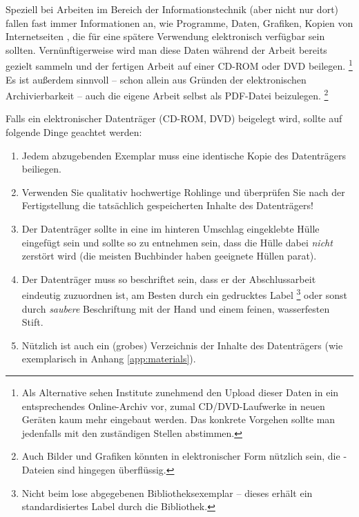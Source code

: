 Speziell bei Arbeiten im Bereich der Informationstechnik (aber
nicht nur dort) fallen fast immer Informationen an, wie Programme,
Daten, Grafiken, Kopien von Internetseiten \usw, die für eine
spätere Verwendung elektronisch verfügbar sein sollten.
Vernünftigerweise wird man diese Daten während der Arbeit bereits
gezielt sammeln und der fertigen Arbeit auf einer CD-ROM oder DVD  beilegen.%
\footnote{Als Alternative sehen Institute zunehmend den Upload dieser Daten
in ein entsprechendes Online-Archiv vor, zumal CD/DVD-Laufwerke in
neuen Geräten kaum mehr eingebaut werden. Das konkrete Vorgehen sollte man 
jedenfalls mit den zuständigen Stellen abstimmen.}
Es ist außerdem sinnvoll -- schon allein
aus Gründen der elektronischen Archivierbarkeit -- auch die eigene Arbeit
selbst als PDF-Datei beizulegen.%
\footnote{Auch Bilder und Grafiken könnten in elektronischer Form nützlich
sein, die \latex-Dateien sind hingegen überflüssig.}

Falls ein elektronischer Datenträger (CD-ROM, DVD) beigelegt
wird, sollte auf folgende Dinge geachtet werden:
%
\begin{enumerate}
\item Jedem abzugebenden Exemplar muss eine identische Kopie des
Datenträgers beiliegen. %
\item Verwenden Sie qualitativ hochwertige Rohlinge und überprüfen
Sie nach der Fertigstellung die tatsächlich gespeicherten Inhalte
des Datenträgers! %
\item Der Datenträger sollte in eine im hinteren Umschlag
eingeklebte Hülle eingefügt sein und sollte so zu entnehmen sein,
dass die Hülle dabei \emph{nicht} zerstört wird (die
meisten Buchbinder haben geeignete Hüllen parat). %
\item Der Datenträger muss so beschriftet sein, dass er der
Abschlussarbeit eindeutig zuzuordnen ist, am Besten durch ein
gedrucktes Label%
\footnote{Nicht beim lose abgegebenen Bibliotheksexemplar --
dieses erhält ein standardisiertes Label durch die Bibliothek.} %
oder sonst durch \emph{saubere}
Beschriftung mit
der Hand und einem feinen, wasserfesten Stift. %
\item Nützlich ist auch ein (grobes) Verzeichnis der Inhalte des
Datenträgers (wie exemplarisch in Anhang \ref{app:materials}).
\end{enumerate}
